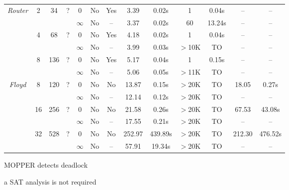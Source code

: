 \begin{savenotes}
\begin{table*}[t]
\begin{center}
\begin{threeparttable}
\begin{tabular}{|c|c|c|c|c|c|c||c|c||c|c||c|c|}
            \multirow{6}{*}{\textit{Router}} & \multirow{2}{*}{2} & \multirow{2}{*}{34} &  \multirow{2}{*}{?} 
          												     & 0 & No & Yes & 3.39 & 0.02s & 1 & 0.04s & -- & -- \tnote{a}\\ \cline{5-13}
          						       &                            & &  &  $\infty$ & No & -- & 3.37 & 0.02s & 60 & 13.24s &  -- & --\\ \cline{2-13}
						       		& \multirow{2}{*}{4} & \multirow{2}{*}{68} &  \multirow{2}{*}{?} 
          												     & 0 & No & Yes & 4.18 & 0.02s & 1 & 0.04s & -- & --\tnote{a}\\ \cline{5-13}
          						       &                            & &  &  $\infty$ & No & -- & 3.99 & 0.03s & $>$10K & TO &  -- & --\\ \cline{2-13}
						              & \multirow{2}{*}{8} & \multirow{2}{*}{136} &  \multirow{2}{*}{?} 
          												     & 0 & No & Yes & 5.17 & 0.04s & 1 & 0.15s & -- & --\tnote{a}\\ \cline{5-13}
          						       &                            & &  &  $\infty$ & No & -- & 5.06 & 0.05s & $>$11K & TO & --  & --\\ \hline
						       \hline
						       
	    \multirow{6}{*}{\textit{Floyd}} & \multirow{2}{*}{8} & \multirow{2}{*}{120} &  \multirow{2}{*}{?} 
          												     & 0 & No & No & 13.87 & 0.15s & $>$20K & TO & 18.05 & 0.27s\\ \cline{5-13}
          						       &                            & &  &  $\infty$ & No & -- & 12.14 & 0.12s & $>$20K & TO &  -- & --\\ \cline{2-13}
						       		& \multirow{2}{*}{16} & \multirow{2}{*}{256} &  \multirow{2}{*}{?} 
          												     & 0 & No & No & 21.58 & 0.26s & $>$20K & TO & 67.53 & 43.08s\\ \cline{5-13}
          						       &                            & &  &  $\infty$ & No & -- & 17.55 & 0.21s & $>$20K & TO &  -- & --\\ \cline{2-13}
						              & \multirow{2}{*}{32} & \multirow{2}{*}{528} &  \multirow{2}{*}{?} 
          												     & 0 & No & No & 252.97 & 439.89s & $>$20K & TO & 212.30 & 476.52s\\ \cline{5-13}
          						       &                            & &  &  $\infty$ & No & -- & 57.91 & 19.34s & $>$20K & TO & --  & --\\ \hline
         
\end{tabular}
\begin{tablenotes}
\item[\textdagger] MOPPER detects deadlock
\item[a] SAT analysis is not required
\end{tablenotes}
     \end{threeparttable}
\end{center}
\end{table*}
\end{savenotes}


